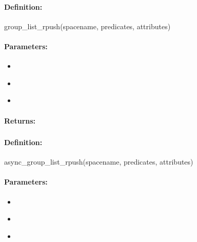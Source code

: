 \paragraph{Definition:}
\begin{rubycode}
group_list_rpush(spacename, predicates, attributes)
\end{rubycode}

\paragraph{Parameters:}
\begin{itemize}[noitemsep]
\item {}\\

\item {}\\

\item {}\\

\end{itemize}

\paragraph{Returns:}


\pagebreak
\subsubsection{}
\label{api:ruby:async_group_list_rpush}


\paragraph{Definition:}
\begin{rubycode}
async_group_list_rpush(spacename, predicates, attributes)
\end{rubycode}

\paragraph{Parameters:}
\begin{itemize}[noitemsep]
\item {}\\

\item {}\\

\item {}\\

\end{itemize}

